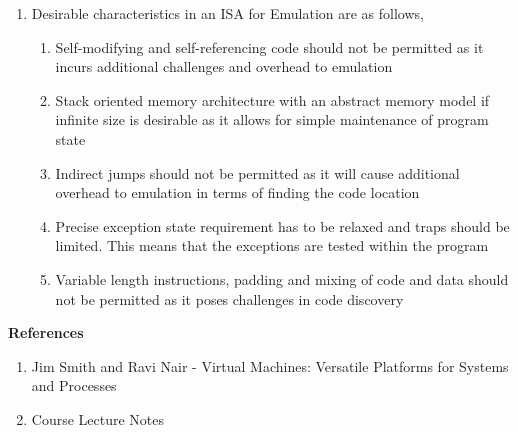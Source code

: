\documentclass[11pt,a4paper,oneside]{article}
\begin{document}
\begin{enumerate}
		\item Desirable characteristics in an ISA for Emulation are as follows,
		      \begin{enumerate}
		      	\item Self-modifying and self-referencing code should not be permitted as it incurs additional challenges and overhead to emulation
		      	\item Stack oriented memory architecture with an abstract memory model if infinite size is desirable as it allows for simple maintenance of program state
		      	\item Indirect jumps should not be permitted as it will cause additional overhead to emulation in terms of finding the code location
		      	\item Precise exception state requirement has to be relaxed and traps should be limited. This means that the exceptions are tested within the program
		      	\item Variable length instructions, padding and mixing of code and data should not be permitted as it poses challenges in code discovery	      	
		      \end{enumerate}
		    
	\end{enumerate}
    
    \textbf{References}
    \begin{enumerate}
    	\item Jim Smith and Ravi Nair - Virtual Machines: Versatile Platforms for Systems and Processes 
    	\item Course Lecture Notes   	
    \end{enumerate}
 

    
\end{document}
